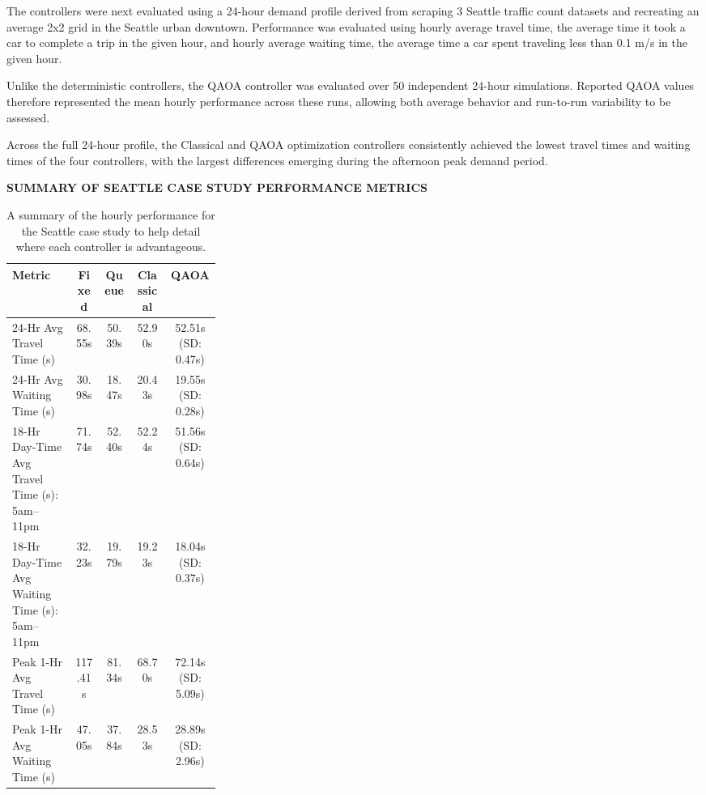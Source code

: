 \documentclass[12pt]{article}
\begin{document}
The controllers were next evaluated using a 24-hour demand profile derived from scraping 3 Seattle traffic count datasets and recreating an average 2x2 grid in the Seattle urban downtown. Performance was evaluated using hourly average travel time, the average time it took a car to complete a trip in the given hour, and hourly average waiting time, the average time a car spent traveling less than 0.1 m/s in the given hour.

Unlike the deterministic controllers, the QAOA controller was evaluated over 50 independent 24-hour simulations. Reported QAOA values therefore represented the mean hourly performance across these runs, allowing both average behavior and run-to-run variability to be assessed.

Across the full 24-hour profile, the Classical and QAOA optimization controllers consistently achieved the lowest travel times and waiting times of the four controllers, with the largest differences emerging during the afternoon peak demand period.

\begin{figure}[htbp]
\label{fig:seattle-traveltime}
\end{figure}

\begin{figure}[htbp]
\label{fig:seattle-waitingtime}
\end{figure}


\begin{table}[H]
\centering
\textbf{\textsc{SUMMARY OF SEATTLE CASE STUDY PERFORMANCE METRICS}}

\vspace{0.3cm}

\begin{tabular}{@{} p{0.30\linewidth} c c c c @{}}
\toprule
\textbf{Metric} & \textbf{Fixed} & \textbf{Queue} & \textbf{Classical} & \textbf{QAOA} \\
\midrule
24-Hr Avg Travel Time (s) & 68.55s & 50.39s & 52.90s & 52.51s (SD: 0.47s) \\
24-Hr Avg Waiting Time (s) & 30.98s & 18.47s & 20.43s & 19.55s (SD: 0.28s) \\

18-Hr Day-Time Avg Travel Time (s): 5am--11pm & 71.74s & 52.40s & 52.24s & 51.56s (SD: 0.64s) \\

18-Hr Day-Time Avg Waiting Time (s): 5am--11pm & 32.23s & 19.79s & 19.23s & 18.04s (SD: 0.37s) \\

Peak 1-Hr Avg Travel Time (s) & 117.41s & 81.34s & 68.70s & 72.14s (SD: 5.09s) \\

Peak 1-Hr Avg Waiting Time (s) & 47.05s & 37.84s & 28.53s & 28.89s (SD: 2.96s) \\
\bottomrule
\end{tabular}
\caption{A summary of the hourly performance for the Seattle case study to help detail where each controller is advantageous.}
\label{tab:seattle-summary}
\end{table}
\end{document}
